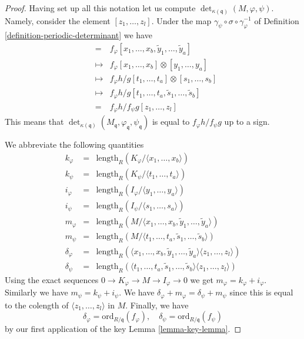 \begin{proof}
\medskip\noindent
Having set up all this
notation let us compute $\det_{\kappa(\mathfrak q)}(M, \varphi, \psi)$.
Namely, consider the element $[z_1, \ldots, z_l]$.
Under the map $\gamma_\psi \circ \sigma \circ \gamma_\varphi^{-1}$
of Definition \ref{definition-periodic-determinant} we have
\begin{eqnarray*}
[z_1, \ldots, z_l] & = &
f_\varphi [x_1, \ldots, x_b, \tilde y_1, \ldots, \tilde y_a] \\
& \mapsto & f_\varphi [x_1, \ldots, x_b] \otimes [y_1, \ldots, y_a] \\
& \mapsto &
f_\varphi h/g [t_1, \ldots, t_a] \otimes [s_1, \ldots, s_b] \\
& \mapsto &
f_\varphi h/g [t_1, \ldots, t_a, \tilde s_1, \ldots, \tilde s_b] \\
& = &
f_\varphi h/f_\psi g [z_1, \ldots, z_l]
\end{eqnarray*}
This means that
$\det_{\kappa(\mathfrak q)}
(M_{\mathfrak q}, \varphi_{\mathfrak q}, \psi_{\mathfrak q})$
is equal to $f_\varphi h/f_\psi g$ up to a sign.

\medskip\noindent
We abbreviate the following quantities
\begin{eqnarray*}
k_\varphi & = & \text{length}_R(K_\varphi/\langle x_1, \ldots, x_b\rangle) \\
k_\psi    & = & \text{length}_R(K_\psi/\langle t_1, \ldots, t_a\rangle) \\
i_\varphi & = & \text{length}_R(I_\varphi/\langle y_1, \ldots, y_a\rangle) \\
i_\psi    & = & \text{length}_R(I_\psi/\langle s_1, \ldots, s_a\rangle) \\
m_\varphi & = & \text{length}_R(M/
\langle x_1, \ldots, x_b, \tilde y_1, \ldots, \tilde y_a\rangle) \\
m_\psi    & = & \text{length}_R(M/
\langle t_1, \ldots, t_a, \tilde s_1, \ldots, \tilde s_b\rangle) \\
\delta_\varphi & = & \text{length}_R(
\langle x_1, \ldots, x_b, \tilde y_1, \ldots, \tilde y_a\rangle
\langle z_1, \ldots, z_l\rangle) \\
\delta_\psi & = & \text{length}_R(
\langle t_1, \ldots, t_a, \tilde s_1, \ldots, \tilde s_b\rangle
\langle z_1, \ldots, z_l\rangle)
\end{eqnarray*}
Using the exact sequences $0 \to K_\varphi \to M \to I_\varphi \to 0$
we get $m_\varphi = k_\varphi + i_\varphi$. Similarly we have
$m_\psi = k_\psi + i_\psi$. We have
$\delta_\varphi + m_\varphi = \delta_\psi + m_\psi$ since this
is equal to the colength of $\langle z_1, \ldots, z_l \rangle$
in $M$. Finally, we have
$$
\delta_\varphi = \text{ord}_{R/\mathfrak q}(f_\varphi),
\quad
\delta_\psi = \text{ord}_{R/\mathfrak q}(f_\psi)
$$
by our first application of the key Lemma \ref{lemma-key-lemma}.


\end{proof}
